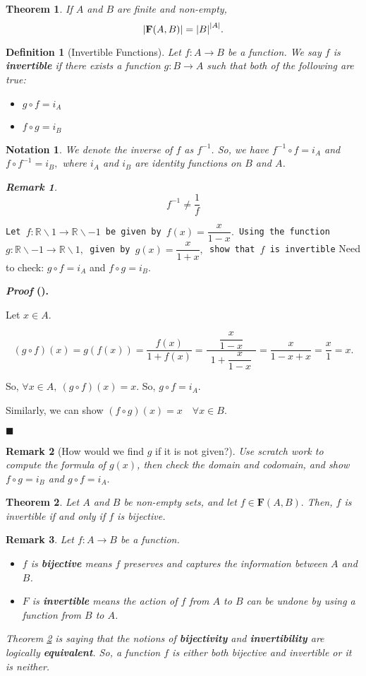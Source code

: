 \documentclass[12pt,a4paper]{article}
\newtheorem{nota}{Notation}[section]
\newtheorem{thm}{Theorem}[subsection]
\newtheorem{df}{Definition}[subsection]
\newcounter{nprf}[subsection]
\newtheorem*{rmk}{\indent Remark}
\newenvironment*{prf}{\par\indent\textbf{\textit{Proof} (\stepcounter{nprf}\thenprf). }\par }{\par\hfill $\blacksquare$\par}
\def\R{{\mathbb{R}}}
\def\f{f^{-1}}
\def\of{\circ}
\def\F{\mathbf{F}}
\begin{document}
\begin{thm}
	If $A$ and $B$ are finite and non-empty, \[\qty|\F(A,B)|=\qty|B|^{\qty|A|}.\]	
\end{thm}
\begin{df}[Invertible Functions]
	Let $f:A\to B$ be a function. We say $f$ is \textbf{invertible} if there exists a function $g:B\to A$ such that both of the following are true: \begin{itemize}
		\item $g\of f=i_A$ \item $f\of g=i_B$
	\end{itemize}
\end{df}
\begin{nota}
	We denote the inverse of $f$ as $\f$. So, we have $\f\of f=i_A$ and $f\of\f=i_B,$ where $i_A$ and $i_B$ are identity functions on $B$ and $A$. 	
	\begin{rmk}\[\f\neq\dfrac{1}{f}\] \end{rmk}
\end{nota}
\begin{framed}
\noindent\texttt{Let $f:\R\backslash\qty{1}\to\R\backslash\qty{-1}$ be given by $f(x)=\dfrac{x}{1-x}.$ Using the function $g:\R\backslash\qty{-1}\to\R\backslash\qty{1},$ given by $g(x)=\dfrac{x}{1+x},$ show that $f$ is invertible}
Need to check: $g\of f=i_A$ and $f\of g=i_B.$
\begin{prf}
	Let $x\in A.$\par \[(g\of f)(x)=g(f(x))=\dfrac{f(x)}{1+f(x)}=\dfrac{\ \ \dfrac{x}{1-x}\ \ }{\ \ 1+\dfrac{x}{1-x}\ \ }=\dfrac{x}{1-x+x}=\dfrac{x}{1}=x.\]\par So, $\forall x\in A,\ (g\of f)(x)=x.$ So, $g\of f=i_A.$\par Similarly, we can show $(f\of g)(x)=x\quad\forall x\in B.$
\end{prf}
\end{framed}
\begin{rmk}[How would we find $g$ if it is not given?]
	Use scratch work to compute the formula of $g(x)$, then check the domain and codomain, and show $f\of g=i_B$ and $g\of f=i_A.$
\end{rmk}
\begin{thm}\label{thm3.3.2}
	Let $A$ and $B$ be non-empty sets, and let $f\in\F(A,B).$ Then, $f$ is invertible if and only if $f$ is bijective.
\end{thm}
\begin{rmk}
	Let $f:A\to B$ be a function.\begin{itemize}
		\item $f$ is \textbf{bijective} means $f$ preserves and captures the information between $A$ and $B$.
		\item $F$ is \textbf{invertible} means the action of $f$ from $A$ to $B$ can be undone by using a function from $B$ to $A$.
	\end{itemize}\par 
	Theorem \ref{thm3.3.2} is saying that the notions of \textbf{bijectivity} and \textbf{invertibility} are logically \textbf{equivalent}. So, a function $f$ is either both bijective and invertible or it is neither. 
\end{rmk}
\end{document}
